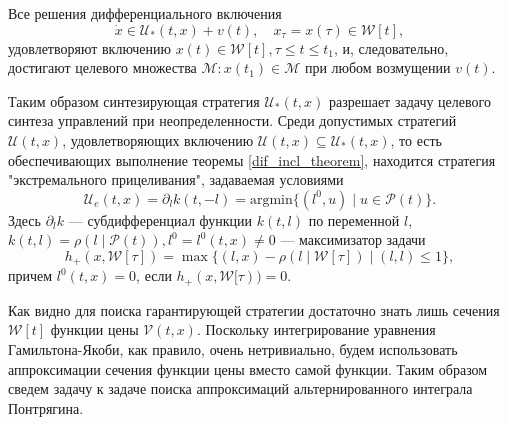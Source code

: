 \begin{theorem}\label{dif_incl_theorem}
    Все решения дифференциального включения
    \begin{equation*}
        \dot{x} \in \mathcal{U}_*(t,x) + v(t), \quad x_{\tau} = x(\tau) \in \mathcal{W}[t],
    \end{equation*}
    удовлетворяют включению \( x(t) \in \mathcal{W}[t] , \tau \le t \le t_1 \), и, следовательно,
     достигают целевого множества \( \mathcal{M} : x(t_1) \in \mathcal{M} \) при любом возмущении
     \( v(t) \). 
\end{theorem}

Таким образом синтезирующая стратегия \( \mathcal{U}_*(t,x) \) разрешает задачу целевого синтеза 
 управлений при неопределенности. Среди допустимых стратегий \( \mathcal{U}(t,x) \), удовлетворяющих
 включению \( \mathcal{U}(t,x) \subseteq \mathcal{U}_*(t,x) \), то есть обеспечивающих выполнение
 теоремы \eqref{dif_incl_theorem}, находится стратегия "экстремального прицеливания", задаваемая
 условиями
\begin{equation}
    \mathcal{U}_e(t,x) = \partial_l k(t, -l) = \mathrm{arg min} \{(l^0, u) \mid u \in \mathcal{P}(t) \}.
\end{equation}
Здесь \( \partial_l k \) --- субдифференциал функции \( k(t, l) \) по переменной \( l \), \( k(t,l)
 = \rho(l \mid \mathcal{P}(t)), l^0 = l^0(t, x) \ne 0 \) --- максимизатор задачи 
\begin{equation}
    h_+(x, \mathcal{W}[\tau]) = \max \{(l,x) - \rho(l \mid \mathcal{W}[\tau]) \mid (l,l) \le 1 \},
\end{equation}
причем \( l^0(t,x) = 0 \), если \( h_+(x, \mathcal{W}[\tau)) = 0 \).

Как видно для поиска гарантирующей стратегии достаточно знать лишь сечения \( \mathcal{W}[t] \) функции
 цены \( \mathcal{V}(t,x) \). Поскольку интегрирование уравнения Гамильтона-Якоби, как правило, очень 
 нетривиально, будем использовать аппроксимации сечения функции цены вместо самой функции. Таким 
 образом сведем задачу к задаче поиска аппроксимаций альтернированного интеграла Понтрягина.